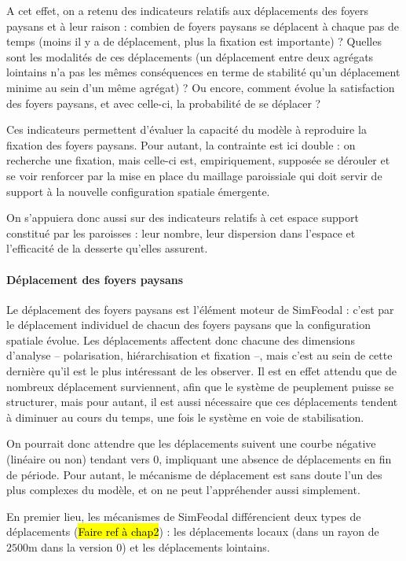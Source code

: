 A cet effet, on a retenu des indicateurs relatifs aux déplacements des foyers paysans et à leur raison :
combien de foyers paysans se déplacent à chaque pas de temps (moins il y a de déplacement, plus la fixation est importante) ? Quelles sont les modalités de ces déplacements (un déplacement entre deux agrégats lointains n'a pas les mêmes conséquences en terme de stabilité qu'un déplacement minime au sein d'un même agrégat) ? Ou encore, comment évolue la satisfaction des foyers paysans, et avec celle-ci, la probabilité de se déplacer ?

Ces indicateurs permettent d'évaluer la capacité du modèle à reproduire la fixation des foyers paysans.
Pour autant, la contrainte est ici double :
on recherche une fixation, mais celle-ci est, empiriquement, supposée se dérouler et se voir renforcer par la mise en place du maillage paroissiale qui doit servir de support à la nouvelle configuration spatiale émergente.

On s'appuiera donc aussi sur des indicateurs relatifs à cet espace support constitué par les paroisses :
leur nombre, leur dispersion dans l'espace et l'efficacité de la desserte qu'elles assurent.

\paragraph{Déplacement des foyers paysans}

Le déplacement des foyers paysans est l'élément moteur de SimFeodal :
c'est par le déplacement individuel de chacun des foyers paysans que la configuration spatiale évolue.
Les déplacements affectent donc chacune des dimensions d'analyse -- polarisation, hiérarchisation et fixation --, mais c'est au sein de cette dernière qu'il est le plus intéressant de les observer.
Il est en effet attendu que de nombreux déplacement surviennent, afin que le système de peuplement puisse se structurer, mais pour autant, il est aussi nécessaire que ces déplacements tendent à diminuer au cours du temps, une fois le système en voie de stabilisation.

On pourrait donc attendre que les déplacements suivent une courbe négative (linéaire ou non) tendant vers 0, impliquant une absence de déplacements en fin de période.
Pour autant, le mécanisme de déplacement est sans doute l'un des plus complexes du modèle, et on ne peut l'appréhender aussi simplement.

En premier lieu, les mécanismes de SimFeodal différencient deux types de déplacements (\hl{Faire ref à chap2}) :
les déplacements locaux (dans un rayon de $2500$m dans la version 0) et les déplacements lointains.

